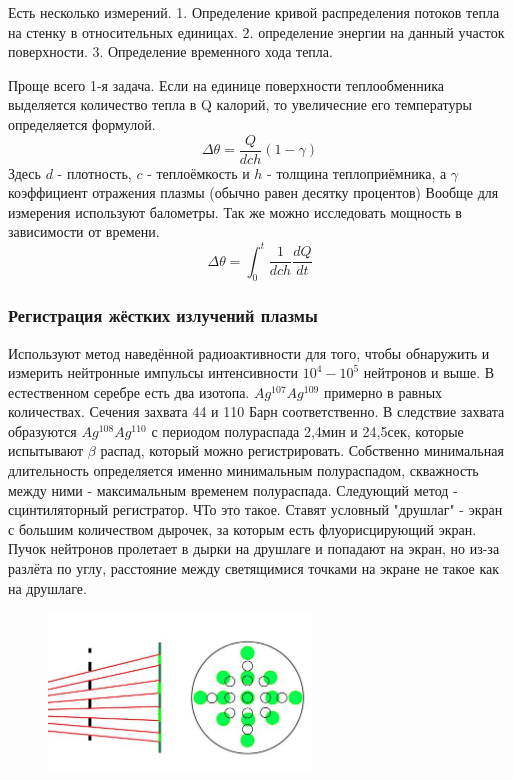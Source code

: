 \documentclass[10pt, a4paper]{article}
\begin{document}
Есть несколько измерений.
1. Определение кривой распределения потоков тепла на стенку в относительных единицах.
2. определение энергии на данный участок поверхности.
3. Определение временного хода тепла.


Проще всего 1-я задача. Если на единице поверхности теплообменника выделяется количество тепла в Q калорий, то увеличесние его температуры определяется формулой.
 \begin{equation}
	\Delta \theta= \frac{Q}{dch} (1-\gamma)
\end{equation}
Здесь $d$ - плотность, $c$ - теплоёмкость и $h$ - толщина теплоприёмника, а $\gamma$ коэффициент отражения плазмы (обычно равен десятку процентов)
Вообще для измерения используют балометры. Так же можно исследовать мощность в зависимости от времени.
 \begin{equation}
	\Delta \theta= \int_{0}^{t} \frac{1}{dch} \frac{dQ}{dt}
\end{equation}

\subsubsection{Регистрация жёстких излучений плазмы}

Используют метод наведённой радиоактивности для того, чтобы обнаружить и измерить нейтронные импульсы интенсивности $10^4 - 10^5$ нейтронов и выше.
В естественном серебре есть два изотопа. $Ag^{107} Ag^{109}$ примерно в равных количествах. Сечения захвата 44 и 110 Барн соответственно. В следствие захвата образуются  $Ag^{108} Ag^{110}$ с периодом полураспада 2,4мин и 24,5сек, которые испытывают $\beta$ распад, который можно регистрировать. Собственно минимальная длительность определяется именно минимальным полураспадом, скважность между ними - максимальным временем полураспада.
Следующий метод - сцинтиляторный регистратор. ЧТо это такое. Ставят условный "друшлаг" - экран с большим количеством дырочек, за которым есть флуорисцирующий экран. Пучок нейтронов пролетает в дырки на друшлаге и попадают на экран, но из-за разлёта по углу, расстояние между светящимися точками на экране не такое как на друшлаге.

\begin{figure}[ht]
	\begin{center}
		\includegraphics[width=70mm]{scintelator.JPG}
	\end{center}
\end{figure}
\end{document}
